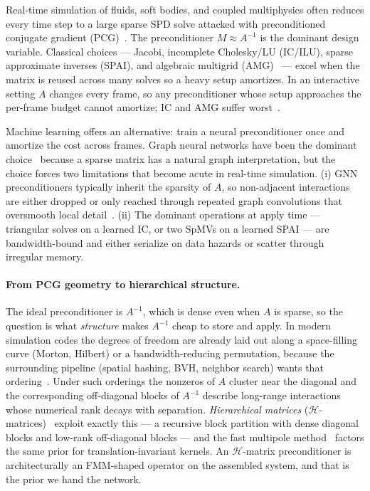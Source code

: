 \documentclass[acmtog,anonymous,review]{acmart}
\theoremstyle{plain}
\begin{document}
Real-time simulation of fluids, soft bodies, and coupled multiphysics often reduces
every time step to a large sparse SPD solve attacked with preconditioned conjugate
gradient (PCG)~\cite{saad2003iterative}. The preconditioner $M\!\approx\!A^{-1}$ is the
dominant design variable. Classical choices --- Jacobi, incomplete Cholesky/LU
(IC/ILU), sparse approximate inverses (SPAI), and algebraic multigrid
(AMG)~\cite{lin1999incomplete,kolotilina1993factorized,benzi1996sparse,ruge1987algebraic}
--- excel when the matrix is reused across many solves so a heavy setup amortizes. In
an interactive setting $A$ changes every frame, so any preconditioner whose setup
approaches the per-frame budget cannot amortize; IC and AMG suffer
worst~\cite{naumov2015amgx,liu2016synchronization,yamazaki2020performance}.

Machine learning offers an alternative: train a neural preconditioner once and amortize
the cost across frames. Graph neural networks have been the dominant
choice~\cite{Li2023learning,hausner2023neural,chen2024gnp,Yang2025sparse} because a
sparse matrix has a natural graph interpretation, but the choice forces two limitations
that become acute in real-time simulation. (i) GNN preconditioners typically inherit
the sparsity of $A$, so non-adjacent interactions are either dropped or only reached
through repeated graph convolutions that oversmooth local
detail~\cite{chen2020simple,trifonov2025gnn}. (ii) The dominant operations at apply
time --- triangular solves on a learned IC, or two SpMVs on a learned SPAI --- are
bandwidth-bound and either serialize on data hazards or scatter through irregular
memory.

\paragraph{From PCG geometry to hierarchical structure.}
The ideal preconditioner is $A^{-1}$, which is dense even when $A$ is sparse, so the
question is what \emph{structure} makes $A^{-1}$ cheap to store and apply. In modern
simulation codes the degrees of freedom are already laid out along a space-filling
curve (Morton, Hilbert) or a bandwidth-reducing permutation, because the surrounding
pipeline (spatial hashing, BVH, neighbor search) wants that
ordering~\cite{karras2012maximizing,teschner2003optimized,ihmsen2011parallel}. Under
such orderings the nonzeros of $A$ cluster near the diagonal and the corresponding
off-diagonal blocks of $A^{-1}$ describe long-range interactions whose numerical rank
decays with separation. \emph{Hierarchical matrices}
($\mathcal{H}$-matrices)~\cite{hackbusch1999sparse,hackbusch2002adaptive,borm2003introduction}
exploit exactly this --- a recursive block partition with dense diagonal blocks and
low-rank off-diagonal blocks --- and the fast multipole method~\cite{greengard1987fast}
factors the same prior for translation-invariant kernels. An $\mathcal{H}$-matrix
preconditioner is architecturally an FMM-shaped operator on the assembled system, and
that is the prior we hand the network.
\end{document}
